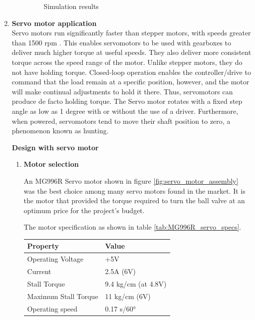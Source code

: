 \begin{enumerate}
\begin{enumerate}
\begin{figure}[H]
        \caption{Simulation results}
        \label{fig:SimulationResults}
    \end{figure}
    
     
    \end{enumerate}
    
    
    \item \textbf{Servo motor application}\\
    Servo motors run significantly faster than stepper motors, with speeds greater than 1500 rpm \cite{halicioglu2016mechanisms}. This enables servomotors to be used with gearboxes to deliver much higher torque at useful speeds. They also deliver more consistent torque across the speed range of the motor. Unlike stepper motors, they do not have holding torque. Closed-loop operation enables the controller/drive to command that the load remain at a specific position, however, and the motor will make continual adjustments to hold it there. Thus, servomotors can produce de facto holding torque\cite{halicioglu2016mechanisms}. The Servo motor rotates with a fixed step angle as low as 1 degree with or without the use of a driver. Furthermore, when powered, servomotors tend to move their shaft position to zero, a phenomenon known as hunting.
    \par
    \textbf{Design with servo motor}
    \begin{enumerate}
    \par
    \item \textbf{Motor selection}
    \par
    An MG996R Servo motor shown in figure \ref{fig:servo_motor_assembly} was the best choice among many servo motors found in the market. It is the motor that provided the torque required to turn the ball valve at an optimum price for the project's budget. 
    \par
    The motor specification as shown in table \ref{tab:MG996R_servo_specs}.
    \begin{table}[H]
    \centering
    \begin{tabular}{|l|l|}
    \hline
    \textbf{Property} & \textbf{Value} \\ \hline
    Operating Voltage & +5V \\ \hline
    Current & 2.5A (6V) \\ \hline
    Stall Torque & 9.4 kg/cm (at 4.8V) \\ \hline
    Maximum Stall Torque & 11 kg/cm (6V) \\ \hline
    Operating speed & 0.17 s/60° \\ \hline

\end{tabular}
\end{table}
\end{enumerate}
\end{enumerate}
